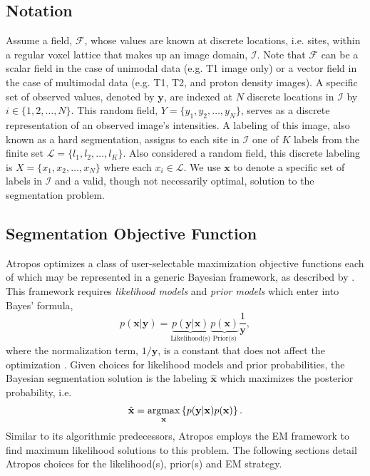\documentclass[11pt,english]{article}
\newcommand{\argmax}{\operatornamewithlimits{argmax}}
\begin{document}
\subsection{Notation}
Assume a field, $\mathcal{F}$, whose values are known at discrete
locations, i.e. sites, within a regular voxel lattice that makes up an
image domain, $\mathcal{I}$.  Note that $\mathcal{F}$ can be a scalar
field in the case of unimodal data (e.g. T1 image only) or a vector
field in the case of multimodal data (e.g. T1, T2, and proton density
images).  A specific set of observed values, denoted by $\mathbf{y}$,
are indexed at $N$ discrete locations in $\mathcal{I}$ by $i \in \{1,
2, \ldots, N\}$.  This random field, $Y = \{y_1, y_2, \ldots, y_N \}$,
serves as a discrete representation of an observed image's intensities.  A labeling
of this image, also known as a hard segmentation, assigns to each site
in $\mathcal{I}$ one of $K$ labels from the finite set $\mathcal{L} =
\{l_1, l_2, \ldots, l_K\}$.  Also considered a random field, this
discrete labeling is $X = \{x_1, x_2, \ldots, x_N\}$ where each
$x_i \in \mathcal{L}$.   We use $\mathbf{x}$ to denote a specific set of labels in
$\mathcal{I}$ and a valid, though not necessarily optimal, solution to the segmentation problem.


\subsection{Segmentation Objective Function} Atropos optimizes a class
of user-selectable maximization objective functions each of which may
be represented in a generic Bayesian framework, as described by \cite{Sanjay-Gopal1998}.  This framework
requires {\em likelihood models} and {\em prior models} which enter
into Bayes' formula,
\begin{equation}\label{eq:bayes}
p(\mathbf{x}|\mathbf{y})=\underbrace{
p(\mathbf{y}|\mathbf{x})}_{\text{Likelihood(s)}} \underbrace{
p(\mathbf{x})}_{\text{Prior(s)}}\frac{1}{\mathbf{y}}, 
\end{equation} 
where the normalization term, $1/\mathbf{y}$, is a constant that does
not affect the optimization \citep{Sanjay-Gopal1998}.
Given choices for likelihood models and prior probabilities, the Bayesian
segmentation solution is the labeling $\hat{\mathbf{x}}$ which
maximizes the posterior probability, i.e.
\begin{align} \hat{\mathbf{x}} = \argmax_{\mathbf{x}}
\left\{p(\mathbf{y}|\mathbf{x})p(\mathbf{x})\right\}.
\end{align} Similar to its algorithmic predecessors, Atropos employs
the EM framework \citep{Dempster1977} to find maximum likelihood
solutions to this problem.  The following sections detail
Atropos choices for the likelihood(s), prior(s) and EM strategy.  
\end{document}
